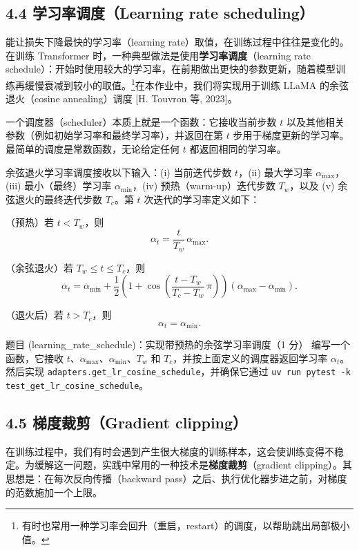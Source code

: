 \subsection*{4.4 学习率调度（Learning rate scheduling）}

能让损失下降最快的学习率（learning rate）取值，在训练过程中往往是变化的。在训练 Transformer 时，一种典型做法是使用\textbf{学习率调度}（learning rate schedule）：开始时使用较大的学习率，在前期做出更快的参数更新，随着模型训练再缓慢衰减到较小的取值。\footnote{有时也常用一种学习率会回升（重启，restart）的调度，以帮助跳出局部极小值。}在本作业中，我们将实现用于训练 LLaMA 的余弦退火（cosine annealing）调度 [H. Touvron 等, 2023]。

一个调度器（scheduler）本质上就是一个函数：它接收当前步数 $t$ 以及其他相关参数（例如初始学习率和最终学习率），并返回在第 $t$ 步用于梯度更新的学习率。最简单的调度是常数函数，无论给定任何 $t$ 都返回相同的学习率。

余弦退火学习率调度接收以下输入：(i) 当前迭代步数 $t$，(ii) 最大学习率 $\alpha_{\max}$，(iii) 最小（最终）学习率 $\alpha_{\min}$，(iv) 预热（warm-up）迭代步数 $T_w$，以及 (v) 余弦退火的最终迭代步数 $T_c$。第 $t$ 次迭代的学习率定义如下：

（预热）若 $t < T_w$，则
\[
\alpha_t = \frac{t}{T_w}\,\alpha_{\max}.
\]

（余弦退火）若 $T_w \le t \le T_c$，则
\[
\alpha_t = \alpha_{\min} + \frac{1}{2}\left(1 + \cos\!\left(\frac{t - T_w}{T_c - T_w}\,\pi\right)\right)\!\left(\alpha_{\max} - \alpha_{\min}\right).
\]

（退火后）若 $t > T_c$，则
\[
\alpha_t = \alpha_{\min}.
\]

\begin{problembox}{题目 (learning\_rate\_schedule)：实现带预热的余弦学习率调度（1 分）}
编写一个函数，它接收 $t$、$\alpha_{\max}$、$\alpha_{\min}$、$T_w$ 和 $T_c$，并按上面定义的调度器返回学习率 $\alpha_t$。然后实现 \texttt{adapters.get\_lr\_cosine\_schedule}，并确保它通过 \texttt{uv run pytest -k test\_get\_lr\_cosine\_schedule}。
\end{problembox}

\subsection*{4.5 梯度裁剪（Gradient clipping）}

在训练过程中，我们有时会遇到产生很大梯度的训练样本，这会使训练变得不稳定。为缓解这一问题，实践中常用的一种技术是\textbf{梯度裁剪}（gradient clipping）。其思想是：在每次反向传播（backward pass）之后、执行优化器步进之前，对梯度的范数施加一个上限。

